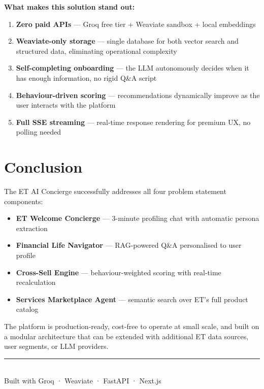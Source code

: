 \documentclass[12pt,a4paper]{article}
\begin{document}
\begin{highlight}
\textbf{What makes this solution stand out:}
\begin{enumerate}[noitemsep]
  \item \textbf{Zero paid APIs} — Groq free tier + Weaviate sandbox + local embeddings
  \item \textbf{Weaviate-only storage} — single database for both vector search and structured data, eliminating operational complexity
  \item \textbf{Self-completing onboarding} — the LLM autonomously decides when it has enough information, no rigid Q\&A script
  \item \textbf{Behaviour-driven scoring} — recommendations dynamically improve as the user interacts with the platform
  \item \textbf{Full SSE streaming} — real-time response rendering for premium UX, no polling needed
\end{enumerate}
\end{highlight}

\section{Conclusion}

The ET AI Concierge successfully addresses all four problem statement components:

\begin{itemize}[noitemsep]
  \item[\checkmark] \textbf{ET Welcome Concierge} — 3-minute profiling chat with automatic persona extraction
  \item[\checkmark] \textbf{Financial Life Navigator} — RAG-powered Q\&A personalised to user profile
  \item[\checkmark] \textbf{Cross-Sell Engine} — behaviour-weighted scoring with real-time recalculation
  \item[\checkmark] \textbf{Services Marketplace Agent} — semantic search over ET's full product catalog
\end{itemize}

The platform is production-ready, cost-free to operate at small scale, and built on a modular architecture that can be extended with additional ET data sources, user segments, or LLM providers.

\vspace{1em}
\begin{center}
\textcolor{etMuted}{\rule{8cm}{0.4pt}}\\
\small\textcolor{etMuted}{Built with Groq · Weaviate · FastAPI · Next.js}
\end{center}
\end{document}

